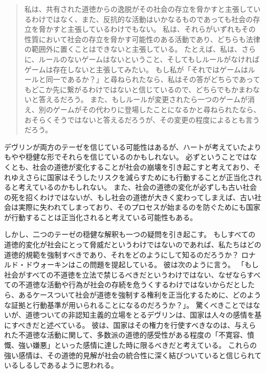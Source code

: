 \documentclass[paper=a4,book,openany]{jlreq}
\newcommand{\ig}[1]{}           %
\begin{document}
\begin{quote}
私は、共有された道徳からの逸脱がその社会の存立を脅かすと主張しているわけではなく、また、反抗的な活動はいかなるものであっても社会の存立を脅かすと主張しているわけでもない。
私は、それらがいずれもその性質において社会の存立を脅かす可能性のある活動であり、どちらも法律の範囲外に置くことはできないと主張している。
たとえば、私は、さらに、ルールのないゲームはないということ、そしてもしルールがなければゲームは存在しないと主張してみたい。
もし私が「それではゲームはルールと同一であるか？」と尋ねられたなら、私はその答がどちらであってもどこか先に繋がるわけではないと信じているので、どちらでもかまわないと答えるだろう。
また、もしルールが変更されたら一つのゲームが消え、別のゲームがその代わりに登場したことになるかと尋ねられたなら、おそらくそうではないと答えるだろうが、その変更の程度によるとも言うだろう。
\citep[p.37]{devlin65:_enfor_moral}
 \end{quote}

デヴリン\ig{Patrick Devlin}が両方のテーゼを信じている可能性はあるが、ハートが考えていたよりもやや穏健な形でそれらを信じているのかもしれない。
必ずということではなくとも、社会の道徳が変化することが社会の崩壊を引き起こすと考えており、それゆえさらに国家はそうしたリスクを減らすためにも行動することが正当化されると考えているのかもしれない。
また、社会の道徳の変化が必ずしも古い社会の死を招くわけではないが、もし社会の道徳が大きく変わってしまえば、古い社会は実際に失われてしまっており、そのプロセスが始まるのを防ぐためにも国家が行動することは正当化されると考えている可能性もある。

しかし、二つのテーゼの穏健な解釈も一つの疑問を引き起こす。
もしすべての道徳的変化が社会にとって脅威だというわけではないのであれば、私たちはどの道徳的規範を強制すべきであり、それをどのようにして知るのだろうか？ ロナルド・ドウォーキン\ig{Ronald Dworkin}はこの問題を提起している。
彼は次のように言う。
「もし社会がすべての不道徳を立法で禁じるべきだというわけではない、なぜならすべての不道徳な活動や行為が社会の存続を危うくするわけではないからだとしたら、あるケースついて社会が道徳を強制する権利を正当化するために、どのような証拠と行動基準が用いられることになるのだろうか？」\citep{dworkin77:_takin_right_serious}。
驚くべきことではないが、道徳ついての非認知主義的立場をとるデヴリン\ig{Patrick Devlin}は、国家は人々の感情を基にすべきだと述べている。
彼は、国家はその権力を行使すべきなのは、与えられた不道徳な活動に関して、多数派の道徳的感受性がある程度の「不寛容、憤慨、強い嫌悪」といった感情に達した時に限るべきだと考えている\citep[p.17]{devlin65:_enfor_moral}。
これらの強い感情は、その道徳的見解が社会の統合性に深く結びついていると信じられているしるしであるように思われる。
\end{document}
